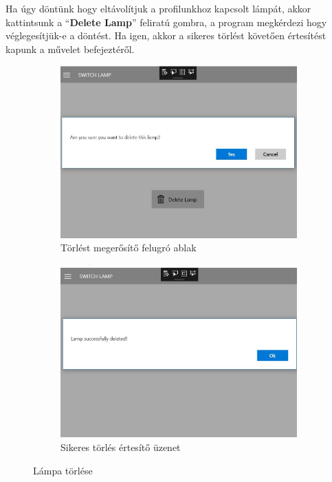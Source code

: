 \documentclass[a4paper,12pt]{report}
\begin{document}
    Ha úgy döntünk hogy eltávolítjuk a profilunkhoz kapcsolt lámpát, akkor kattintsunk a ``\textbf{Delete Lamp}'' feliratú
    gombra, a program megkérdezi hogy véglegesítjük-e a döntést. Ha igen, akkor a sikeres törlést követően értesítést kapunk
    a művelet befejeztéről.

    \begin{figure}[H]
        \centering
        \begin{subfigure}[b]{0.4\linewidth}
            \includegraphics[width=\linewidth]{images/suredelete.jpg}
            \caption{Törlést megerősítő felugró ablak}
        \end{subfigure}
        \begin{subfigure}[b]{0.4\linewidth}
            \includegraphics[width=\linewidth]{images/deletesuccess.jpg}
            \caption{Sikeres törlés értesítő üzenet}
        \end{subfigure}
        \caption{Lámpa törlése}
        \label{fig:LampDelete}
    \end{figure}
\end{document}
